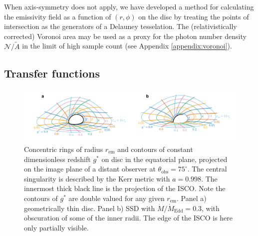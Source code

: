 \documentclass[fleqn,usenatbib]{mnras}
\begin{document}
When axis-symmetry does not apply, we have developed a method for calculating
the emissivity field as a function of $(r, \phi)$ on the disc by treating the
points of intersection as the generators of a Delauney tesselation. The
(relativistically corrected) Voronoi area may be used as a proxy for the photon
number density $\mathcal{N} /\tilde{A}$  in the limit of high sample count (see
Appendix \ref{appendix:voronoi}).

\subsection{Transfer functions}
\label{sec:transfer-functions}

\begin{figure}
    \centering
    \includegraphics[width=0.95\linewidth]{figures/transfer-function.parameterization.pdf}
    \caption{Concentric rings of radius $r_\text{em}$ and contours of constant
    dimensionless redshift $g^\ast$ on disc in the equatorial plane, projected
on the image plane of a distant observer at $\theta_\text{obs} = 75^\circ$. The
central singularity is described by the Kerr metric with $a = 0.998$. The
innermost thick black line is the projection of the ISCO. Note the contours of
$g^\ast$ are double valued for any given $r_\text{em}$. Panel a) geometrically
thin disc. Panel b) SSD with $\dot{M} / \dot{M}_\text{Edd} = 0.3$, with
obscuration of some of the inner radii. The edge of the ISCO is here only
partially visible.}
    \label{fig:transfer-parameterisation}
\end{figure}
\end{document}
